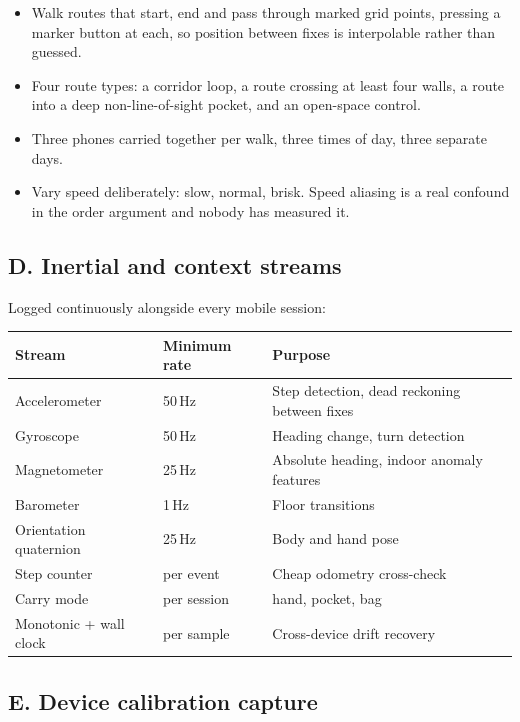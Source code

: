\documentclass[10pt,a4paper]{article}
\begin{document}
\begin{itemize}
\item Walk routes that start, end and pass through marked grid points, pressing a marker
button at each, so position between fixes is interpolable rather than guessed.
\item Four route types: a corridor loop, a route crossing at least four walls, a route
into a deep non-line-of-sight pocket, and an open-space control.
\item Three phones carried together per walk, three times of day, three separate days.
\item Vary speed deliberately: slow, normal, brisk. Speed aliasing is a real confound in
the order argument and nobody has measured it.
\end{itemize}

\subsection{D. Inertial and context streams}

Logged continuously alongside every mobile session:

\begin{center}\small
\begin{tabular}{@{}llp{8.4cm}@{}}
\toprule
Stream & Minimum rate & Purpose \\ \midrule
Accelerometer & 50\,Hz & Step detection, dead reckoning between fixes \\
Gyroscope & 50\,Hz & Heading change, turn detection \\
Magnetometer & 25\,Hz & Absolute heading, indoor anomaly features \\
Barometer & 1\,Hz & Floor transitions \\
Orientation quaternion & 25\,Hz & Body and hand pose \\
Step counter & per event & Cheap odometry cross-check \\
Carry mode & per session & hand, pocket, bag \\
Monotonic + wall clock & per sample & Cross-device drift recovery \\
\bottomrule
\end{tabular}
\end{center}

\subsection{E. Device calibration capture}
\end{document}
